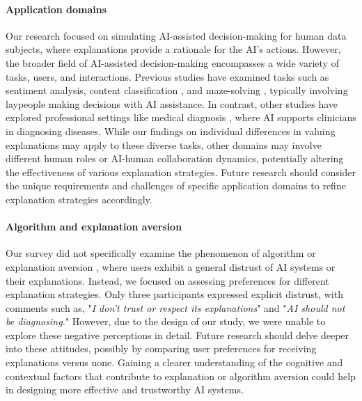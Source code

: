 \paragraph{Application domains}
Our research focused on simulating AI-assisted decision-making for human data subjects, where explanations provide a rationale for the AI's actions. However, the broader field of AI-assisted decision-making encompasses a wide variety of tasks, users, and interactions. Previous studies have examined tasks such as sentiment analysis, content classification \cite{TrustThinkCognitiveForcing,HumanAIInteractionHealthcareThree}, and maze-solving \cite{ExplanationsCanReduceOverrelianceAI}, typically involving laypeople making decisions with AI assistance. In contrast, other studies have explored professional settings like medical diagnosis \cite{DesigningAITrustCollaborationTimeConstrained, ExplainableAIDeadLongLive}, where AI supports clinicians in diagnosing diseases. While our findings on individual differences in valuing explanations may apply to these diverse tasks, other domains may involve different human roles or AI-human collaboration dynamics, potentially altering the effectiveness of various explanation strategies. Future research should consider the unique requirements and challenges of specific application domains to refine explanation strategies accordingly.

\paragraph{Algorithm and explanation aversion}
Our survey did not specifically examine the phenomenon of algorithm or explanation aversion \cite{logg:2019algorithm, dietvorst:2015algorithm}, where users exhibit a general distrust of AI systems or their explanations. Instead, we focused on assessing preferences for different explanation strategies. Only three participants expressed explicit distrust, with comments such as, "{\it I don't trust or respect its explanations}" and "{\it AI should not be diagnosing.}" However, due to the design of our study, we were unable to explore these negative perceptions in detail. Future research should delve deeper into these attitudes, possibly by comparing user preferences for receiving explanations versus none. Gaining a clearer understanding of the cognitive and contextual factors that contribute to explanation or algorithm aversion could help in designing more effective and trustworthy AI systems.

